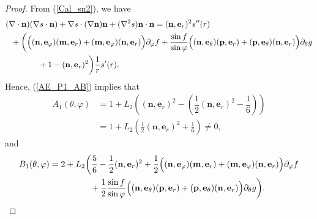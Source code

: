 \documentclass[10pt, a4paper]{article}
\newcommand\n{\mathbf{n}}
\newcommand\e{\mathbf{e}}
\newcommand\m{\mathbf{m}}
\newcommand\p{\mathbf{p}}
\newcommand\pp{\partial}
\begin{document}
\begin{proof}
From (\ref{Cal_sn2}), we have
\begin{equation}
\begin{aligned}
& (\nabla \cdot \n) (\nabla s \cdot \n) + \nabla s \cdot (\nabla \n) \n + (\nabla^2 s) \n \cdot \n  = (\n, \e_r)^2 s''(r) \\
& ~~+ \biggl(\Bigl( (\n, \e_{\varphi})(\m, \e_r) + (\m, \e_{\varphi})(\n, \e_r) \Bigr) \pp_{\varphi} f + \frac{\sin f}{\sin \varphi} \Bigl( (\n, \e_{\theta})(\p, \e_r) + (\p, \e_{\theta})(\n, \e_r) \Bigr)  \pp_{\theta} g \\
& \quad \quad \quad \quad + 1 - (\n, \e_r)^2  \biggr)\dfrac{1}{r} s'(r). \\
\end{aligned}
\end{equation}
Hence, (\ref{AE_P1_AB}) implies that 
\begin{equation}\label{AE_A1_value}
\begin{aligned}
 A_1 (\theta, \varphi) & = 1 + L_2 \left( (\n, \e_r)^2 - \left(  \dfrac{1}{2} (\n, \e_r)^2 - \dfrac{1}{6}  \right) \right) \\
& = 1 + L_2 \left( \frac{1}{2} (\n, \e_r)^2 + \frac{1}{6} \right) \neq 0, 
\end{aligned}
\end{equation}
and
\begin{equation}
\begin{aligned}
  & B_1(\theta, \varphi)  = 2 + L_2 \biggl( \frac{5}{6} - \frac{1}{2} (\n, \e_r)^2 + \frac{1}{2} \Bigl( (\n, \e_{\varphi})(\m, \e_r) + (\m, \e_{\varphi})(\n, \e_r) \Bigr) \pp_{\varphi} f  \\
  & ~~~~~~~~~~~~~~~~~~~~~~~~~  + \frac{1}{2} \frac{\sin f}{\sin \varphi} \Bigl( (\n, \e_{\theta})(\p, \e_r) + (\p, \e_{\theta})(\n, \e_r) \Bigr)  \pp_{\theta} g  \biggr). \\
\end{aligned}
\end{equation}


\end{proof}
\end{document}

